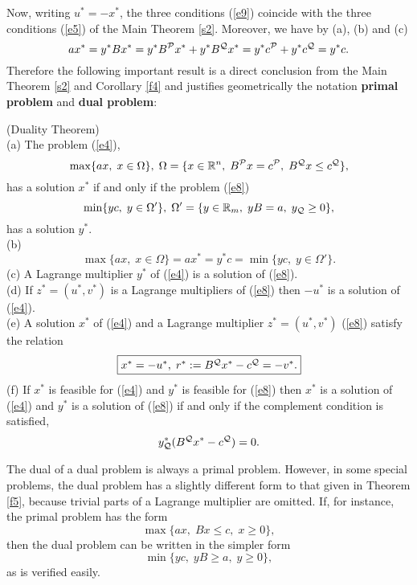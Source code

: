 Now, writing $u^* = - x^*$, the three conditions (\ref{e9}) coincide with the
three conditions (\ref{e5}) of the Main Theorem \ref{s2}. Moreover, we have
by (a), (b) and (c)
\[
ax^* = y^*Bx^*
     = y^*B^{{\cal P}}x^* + y^*B^{{\cal Q}}x^*
     = y^*c^{{\cal P}} + y^*c^{{\cal Q}} = y^*c.
\]
Therefore the following important result is a direct conclusion from the Main
Theorem \ref{s2} and Corollary \ref{f4} and justifies geometrically the
notation {\bf primal problem} and {\bf dual problem}:
%
\begin{theorem} \label{f5} (Duality Theorem)\\
(a) The problem (\ref{e4}),
\[
\max \{ax, \; x \in \Omega\}, \; \Omega = \{x \in \Bbb{R}^n, \; B^{{\cal P}}x =
c^{{\cal P}}, \; B^{{\cal Q}}x \leq c^{{\cal Q}}\},
\]
has a solution $x^*$ if and only if the problem (\ref{e8})
\[
\min \{yc, \; y \in \Omega'\}, \;
\Omega' = \{y \in \Bbb{R}_m, \; yB = a, \; y_{{\cal Q}} \geq 0\},
\]
has a solution $y^*$.\\
(b)
\begin{equation} \label{e10}
\max \{ax, \; x \in \Omega\} = ax^* = y^*c
= \min \{yc, \; y \in \Omega'\}.
\end{equation}
(c) A {\sc Lagrange} multiplier $y^*$ of (\ref{e4}) is
a solution of (\ref{e8}).\\
(d) If $z^* = (u^*,v^*)$ is a {\sc Lagrange} multipliers of
(\ref{e8}) then $- u^*$ is a solution of (\ref{e4}).\\
(e) A solution $x^*$ of (\ref{e4}) and a {\sc Lagrange}
multiplier $z^* = (u^*,v^*)$ (\ref{e8}) satisfy the relation
\begin{equation} \label{e11}
\fbox{$
x^* = - u^*, \; r^* := B^{{\cal Q}}x^* - c^{{\cal Q}} = - v^*.
$}
\end{equation}
(f) If $x^*$ is feasible for (\ref{e4}) and $y^*$ is feasible for
(\ref{e8}) then $x^*$ is a solution of (\ref{e4}) and $y^*$ is a solution
of (\ref{e8}) if and only if the complement condition is satisfied,
\[
y^*_{{\cal Q}}(B^{{\cal Q}}x^* - c^{{\cal Q}}) = 0.
\]
\end{theorem}
%
The dual of a dual problem is always a primal problem.  However, in some
special problems, the dual problem has a slightly different form to that given
in Theorem \ref{f5}, because trivial parts of a {\sc Lagrange} multiplier
are omitted.  If, for instance, the primal problem has the form
\[
\max\{ax, \; Bx \leq c, \; x \geq 0\},
\]
then the dual problem can be written in the simpler form
\[
\min \{yc, \; yB \geq a, \; y \geq 0\},
\]
as is verified easily.
\par
